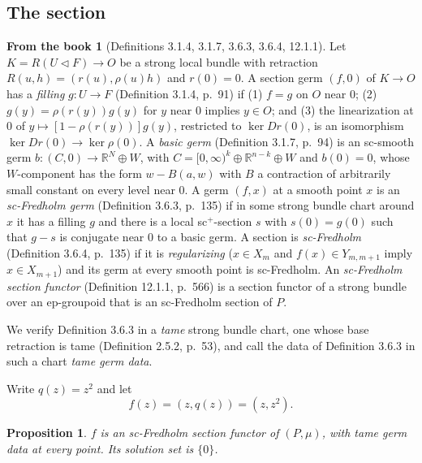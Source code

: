 \documentclass[11pt,a4paper]{article}
\theoremstyle{plain}
\newtheorem{proposition}[theorem]{Proposition}
\theoremstyle{definition}
\newtheorem{recall}[theorem]{From the book}
\theoremstyle{remark}
\newcommand{\R}{\mathbb{R}}
\begin{document}
\subsection{The section}

\begin{recall}[Definitions 3.1.4, 3.1.7, 3.6.3, 3.6.4, 12.1.1]\label{rec:fredholm}
Let $K=R(U\triangleleft F)\to O$ be a strong local bundle with retraction $R(u,h)=(r(u),\rho(u)h)$ and
$r(0)=0$. A section germ $(f,0)$ of $K\to O$ has a \emph{filling} $g\colon U\to F$ (Definition 3.1.4,
p.~91) if (1) $f=g$ on $O$ near $0$; (2) $g(y)=\rho(r(y))g(y)$ for $y$ near $0$ implies $y\in O$; and
(3) the linearization at $0$ of $y\mapsto[1-\rho(r(y))]g(y)$, restricted to $\ker Dr(0)$, is an
isomorphism $\ker Dr(0)\to\ker\rho(0)$. A \emph{basic germ} (Definition 3.1.7, p.~94) is an sc-smooth
germ $b\colon(C,0)\to\R^N\oplus W$, with $C=[0,\infty)^k\oplus\R^{n-k}\oplus W$ and $b(0)=0$, whose
$W$-component has the form $w-B(a,w)$ with $B$ a contraction of arbitrarily small constant on every
level near $0$. A germ $(f,x)$ at a smooth point $x$ is an \emph{sc-Fredholm germ}
(Definition 3.6.3, p.~135) if in some strong bundle chart around $x$ it has a filling $g$ and there is a
local sc$^+$-section $s$ with $s(0)=g(0)$ such that $g-s$ is conjugate near $0$ to a basic germ. A
section is \emph{sc-Fredholm} (Definition 3.6.4, p.~135) if it is \emph{regularizing}
($x\in X_m$ and $f(x)\in Y_{m,m+1}$ imply $x\in X_{m+1}$) and its germ at every smooth point is
sc-Fredholm. An \emph{sc-Fredholm section functor} (Definition 12.1.1, p.~566) is a section functor of a
strong bundle over an ep-groupoid that is an sc-Fredholm section of $P$.
\end{recall}

We verify Definition 3.6.3 in a \emph{tame} strong bundle chart, one whose base retraction is tame
(Definition 2.5.2, p.~53), and call the data of Definition 3.6.3 in such a chart \emph{tame germ data}.

Write $q(z)=z^2$ and let
\[
  f(z)=(z,q(z))=(z,z^2).
\]

\begin{proposition}\label{prop:fredholm}
$f$ is an sc-Fredholm section functor of $(P,\mu)$, with tame germ data at every point. Its solution set
is $\{0\}$.
\end{proposition}
\end{document}
